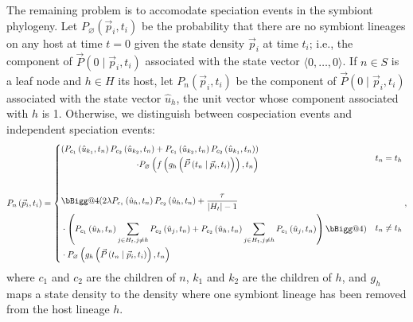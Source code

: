 \documentclass{article}
\makeatletter
\newcommand{\vast}{\bBigg@{4}}
\makeatother
\begin{document}
            The remaining problem is to accomodate speciation events in the
            symbiont phylogeny. Let $P_\varnothing\left(\vec{p}_i, t_i\right)$
            be the probability that there are no symbiont lineages on any host
            at time $t = 0$ given the state density $\vec{p}_i$ at time $t_i$;
            i.e., the component of $\vec{P}\left(0\mid\vec{p}_i, t_i\right)$
            associated with the state vector $\langle0,\dots,0\rangle$.  If $n
            \in S$ is a leaf node and $h \in H$ its host, let
            $P_n\left(\vec{p}_i, t_i\right)$ be the component of
            $\vec{P}\left(0\mid\vec{p}_i, t_i\right)$ associated with the state
            vector $\hat{u}_h$, the unit vector whose component associated with
            $h$ is 1. Otherwise, we distinguish between cospeciation events and
            independent speciation events:
            \begin{equation}
                P_n\left(\vec{p}_i, t_i\right) =
                \begin{cases}
                    \begin{aligned}
                        \left(P_{c_1}\left(\hat{u}_{k_1}, t_n\right)
                        P_{c_2}\left(\hat{u}_{k_2}, t_n\right) +
                        P_{c_1}\left(\hat{u}_{k_2}, t_n\right)
                        P_{c_2}\left(\hat{u}_{k_1}, t_n\right)\right) \\
                        \cdot P_\varnothing\left(f\left(g_h\left(\vec{P}\left(t_n\mid
                        \vec{p}_i, t_i\right)\right)\right), t_n\right)
                    \end{aligned} & t_n = t_h \\[8ex]
                    \begin{aligned}
                        & \vast( 2\lambda P_{c_1}\left(\hat{u}_h,
                        t_n\right) P_{c_2}\left(\hat{u}_h, t_n\right) +
                        \frac{\tau}{\lvert{H_t}\rvert-1} \\
                        &\cdot\left(P_{c_1}\left(\hat{u}_h, t_n\right)
                        \sum_{j\in H_t,j\neq h}{P_{c_2}\left(\hat{u}_j,
                        t_n\right)} + P_{c_2}\left(\hat{u}_h, t_n\right)
                        \sum_{j\in H_t,j\neq h}
                        {P_{c_1}\left(\hat{u}_j,t_n\right)}\right)\vast) \\
                        & \cdot P_\varnothing\left(g_h\left(\vec{P}\left(t_n\mid\vec{p}_i,
                        t_i\right)\right), t_n\right)
                    \end{aligned}
                    & t_n \neq t_h
                \end{cases},
            \end{equation}
            where $c_1$ and $c_2$ are the children of $n$, $k_1$ and $k_2$
            are the children of $h$, and $g_h$ maps a state density to the
            density where one symbiont lineage has been removed from the host
            lineage $h$.
\end{document}
